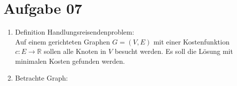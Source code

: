 \documentclass[10pt,a4paper]{article}
\begin{document}
\section*{Aufgabe 07}
    \begin{enumerate}[label={\alph*)}]
        \item Definition Handlungsreisendenproblem: \\
            Auf einem gerichteten Graphen $G = (V,E)$ mit einer
            Kostenfunktion $c: E \rightarrow \mathbb{R}$
            sollen alle Knoten in $V$
            besucht werden. Es soll die L\"osung mit minimalen Kosten
            gefunden werden.
        \item Betrachte Graph: \\
            \begin{figure}[H]
                \centering
                \def\svgwidth{\columnwidth}

\end{figure}
\end{enumerate}
\end{document}
